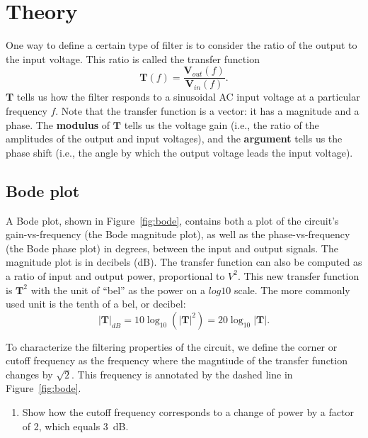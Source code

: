 \documentclass{article}
\begin{document}
\section*{Theory}
One way to define a certain type of filter is to consider the ratio of
the output to the input voltage. This ratio is called the transfer
function
\begin{equation}
  \mathbf{T}(f)=\frac{\mathbf{V}_{out}(f)}{\mathbf{V}_{in}(f)}.
\end{equation}
$\mathbf{T}$ tells us how the filter responds to a sinusoidal AC input
voltage at a particular frequency $f$. Note that the transfer function
is a vector: it has a magnitude and a phase.  The \textbf{modulus} of
$\mathbf{T}$ tells us the voltage gain (i.e., the ratio of the
amplitudes of the output and input voltages), and the
\textbf{argument} tells us the phase shift (i.e., the angle by which
the output voltage leads the input voltage).


\subsection*{Bode plot}
A Bode plot, shown in Figure~\ref{fig:bode}, contains both a plot of
the circuit's gain-vs-frequency (the Bode magnitude plot), as well as
the phase-vs-frequency (the Bode phase plot) in degrees, between the
input and output signals. The magnitude plot is in decibels (dB).  The
transfer function can also be computed as a ratio of input and output
power, proportional to $V^2$. This new transfer function is
$\mathbf{T}^2$ with the unit of ``bel'' as the power on a $log10$
scale. The more commonly used unit is the tenth of a bel, or decibel:
\begin{equation}
  |\mathbf{T}|_{dB}=
  10\log_{10}\left(|\mathbf{T}|^2\right) = 20\log_{10}|\mathbf{T}|.
\end{equation}

To characterize the filtering properties of the circuit, we define the
corner or cutoff frequency as the frequency where the magntiude of the
transfer function changes by $\sqrt{2}$. This frequency is annotated
by the dashed line in Figure~\ref{fig:bode}.

\begin{enumerate}
\item Show how the cutoff frequency corresponds to a change of power
  by a factor of 2, which equals 3~dB.
\end{enumerate}
\end{document}
